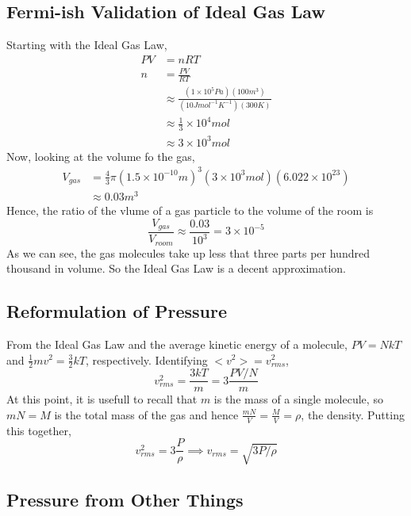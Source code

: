 \documentclass{article}
\begin{document}
\subsection{Fermi-ish Validation of Ideal Gas Law}

Starting with the Ideal Gas Law,
\begin{align*}
PV &= nRT \\
n &= \frac{PV}{RT} \\
&\approx \frac{(1\times10^5 Pa)(100 m^3)}{(10 J mol^{-1} K^{-1})(300 K)} \\
&\approx \frac{1}{3}\times10^4 mol \\
&\approx 3\times10^3 mol
\end{align*}
Now, looking at the volume fo the gas,
\begin{align*}
V_{gas} &= \frac{4}{3}\pi (1.5\times10^{-10} m)^3(3\times 10^3 mol)(6.022\times10^{23}) \\
&\approx 0.03 m^3
\end{align*}
Hence, the ratio of the vlume of a gas particle to the volume of the room is
\begin{equation}
\frac{V_{gas}}{V_{room}} \approx \frac{0.03}{10^3} = 3\times 10^{-5}
\end{equation}
As we can see, the gas molecules take up less that three parts per hundred thousand in volume. So the Ideal Gas Law is a decent approximation.

\subsection{Reformulation of Pressure}

From the Ideal Gas Law and the average kinetic energy of a molecule, $PV = NkT$ and $\frac{1}{2} mv^2 = \frac{3}{2}kT$, respectively. Identifying $<v^2> = v_{rms}^2$,
\begin{equation}
v_{rms}^2 = \frac{3kT}{m} = 3\frac{PV/N}{m}
\end{equation}
At this point, it is usefull to recall that $m$ is the mass of a single molecule, so $mN=M$ is the total mass of the gas and hence $\frac{mN}{V} = \frac{M}{V} = \rho$, the density. Putting this together,
\begin{equation}
v_{rms}^2 = 3\frac{P}{\rho} \implies v_{rms} = \sqrt{3P/\rho}
\end{equation}

\subsection{Pressure from Other Things}
\end{document}
